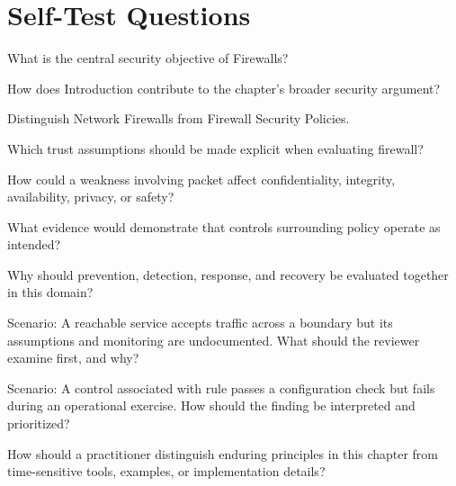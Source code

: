 \documentclass[11pt,letterpaper]{article}
\begin{document}
\section*{Self-Test Questions}
\begin{CornellRecallList}
\item What is the central security objective of Firewalls?
\item How does Introduction contribute to the chapter's broader security argument?
\item Distinguish Network Firewalls from Firewall Security Policies.
\item Which trust assumptions should be made explicit when evaluating firewall?
\item How could a weakness involving packet affect confidentiality, integrity, availability, privacy, or safety?
\item What evidence would demonstrate that controls surrounding policy operate as intended?
\item Why should prevention, detection, response, and recovery be evaluated together in this domain?
\item Scenario: A reachable service accepts traffic across a boundary but its assumptions and monitoring are undocumented. What should the reviewer examine first, and why?
\item Scenario: A control associated with rule passes a configuration check but fails during an operational exercise. How should the finding be interpreted and prioritized?
\item How should a practitioner distinguish enduring principles in this chapter from time-sensitive tools, examples, or implementation details?
\end{CornellRecallList}
\end{document}
